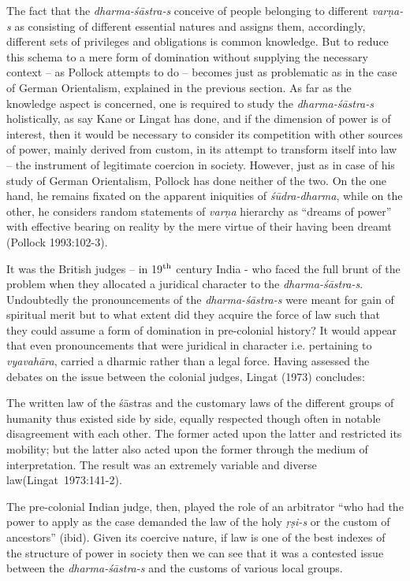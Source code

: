 The fact that the {\sl dharma-śāstra-s} conceive of people belonging to different {\sl varṇa-s} as consisting of different essential natures and assigns them, accordingly, different sets of privileges and obligations is common knowledge. But to reduce this schema to a mere form of domination without supplying the necessary context – as Pollock attempts to do – becomes just as problematic as in the case of German Orientalism, explained in the previous section. As far as the knowledge aspect is concerned, one is required to study the {\sl dharma-śāstra-s} holistically, as say Kane or Lingat has done, and if the dimension of power is of interest, then it would be necessary to consider its competition with other sources of power, mainly derived from custom, in its attempt to transform itself into law – the instrument of legitimate coercion in society. However, just as in case of his study of German Orientalism, Pollock has done neither of the two. On the one hand, he remains fixated on the apparent iniquities of {\sl śūdra-dharma}, while on the other, he considers random statements of {\sl varṇa} hierarchy as “dreams of power” with effective bearing on reality by the mere virtue of their having been dreamt (Pollock 1993:102-3).
\vskip 2pt

It was the British judges – in 19$^{\rm th}$ century India - who faced the full brunt of the problem when they allocated a juridical character to the {\sl dharma-śāstra-s}. Undoubtedly the pronouncements of the {\sl dharma-śāstra-s} were meant for gain of spiritual merit but to what extent did they acquire the force of law such that they could assume a form of domination in pre-colonial history? It would appear that even pronouncements that were juridical in character i.e. pertaining to {\sl vyavahāra}, carried a dharmic rather than a legal force. Having assessed the debates on the issue between the colonial judges, Lingat (1973) concludes:
\smallskip

\begin{myquote}
The written law of the śāstras and the customary laws of the different groups of humanity thus existed side by side, equally respected though often in notable disagreement with each other. The former acted upon the latter and restricted its mobility; but the latter also acted upon the former through the medium of interpretation. The result was an extremely variable and diverse law\hfill(Lingat~1973:141-2).
\end{myquote}
\smallskip

The pre-colonial Indian judge, then, played the role of an arbitrator “who had the power to apply as the case demanded the law of the holy {\sl ṛṣi-s} or the custom of ancestors” (ibid). Given its coercive nature, if law is one of the best indexes of the structure of power in society then we can see that it was a contested issue between the {\sl dharma-śāstra-s} and the customs of various local groups.

